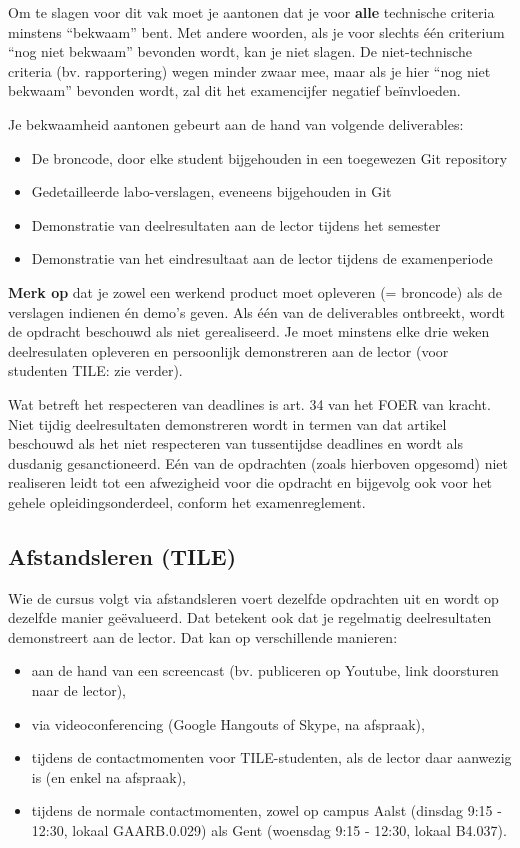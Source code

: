 Om te slagen voor dit vak moet je aantonen dat je voor \textbf{alle} technische criteria minstens ``bekwaam'' bent. Met andere woorden, als je voor slechts één criterium ``nog niet bekwaam'' bevonden wordt, kan je niet slagen. De niet-technische criteria (bv. rapportering) wegen minder zwaar mee, maar als je hier ``nog niet bekwaam'' bevonden wordt, zal dit het examencijfer negatief beïnvloeden.

Je bekwaamheid aantonen gebeurt aan de hand van volgende deliverables:

\begin{itemize}
\item De broncode, door elke student bijgehouden in een toegewezen Git repository
\item Gedetailleerde labo-verslagen, eveneens bijgehouden in Git
\item Demonstratie van deelresultaten aan de lector tijdens het semester
\item Demonstratie van het eindresultaat aan de lector tijdens de examenperiode
\end{itemize}

\textbf{Merk op} dat je zowel een werkend product moet opleveren (= broncode) als de verslagen indienen én demo's geven. Als één van de deliverables ontbreekt, wordt de opdracht beschouwd als niet gerealiseerd. Je moet minstens elke drie weken deelresulaten opleveren en persoonlijk demonstreren aan de lector (voor studenten TILE: zie verder).

Wat betreft het respecteren van deadlines is art. 34 van het FOER van kracht. Niet tijdig deelresultaten demonstreren wordt in termen van dat artikel beschouwd als het niet respecteren van tussentijdse deadlines en wordt als dusdanig gesanctioneerd. Eén van de opdrachten (zoals hierboven opgesomd) niet realiseren leidt tot een afwezigheid voor die opdracht en bijgevolg ook voor het gehele opleidingsonderdeel, conform het examenreglement.

\subsection{Afstandsleren (TILE)}
\label{subs:afstandsleren-tile}

Wie de cursus volgt via afstandsleren voert dezelfde opdrachten uit en
wordt op dezelfde manier geëvalueerd. Dat betekent ook dat je regelmatig
deelresultaten demonstreert aan de lector. Dat kan op verschillende
manieren:

\begin{itemize}
\item aan de hand van een screencast (bv. publiceren op Youtube, link doorsturen naar de lector),
\item via videoconferencing (Google Hangouts of Skype, na afspraak),
\item tijdens de contactmomenten voor TILE-studenten, als de lector daar aanwezig is (en enkel na afspraak),
\item tijdens de normale contactmomenten, zowel op campus Aalst (dinsdag 9:15 - 12:30, lokaal GAARB.0.029) als Gent (woensdag 9:15 - 12:30, lokaal B4.037).
\end{itemize}

